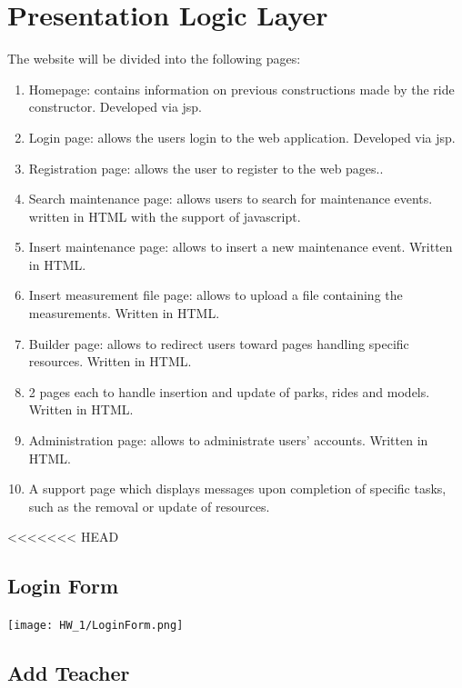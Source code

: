 \section{Presentation Logic Layer}
\graphicspath{ {./HW_1/images/} }

The website will be divided into the following pages:
\begin{enumerate}
    \item Homepage: contains information on previous constructions made by the ride constructor. Developed via
jsp.
    \item Login page: allows the users login to the web application. Developed via jsp.
    \item Registration page: allows the user to register to the web pages..
    \item Search maintenance page: allows users to search for maintenance events. written in HTML with the
support of javascript.
    \item Insert maintenance page: allows to insert a new maintenance event. Written in HTML.
    \item Insert measurement file page: allows to upload a file containing the measurements. Written in HTML.
    \item Builder page: allows to redirect users toward pages handling specific resources. Written in HTML.
    \item 2 pages each to handle insertion and update of parks, rides and models. Written in HTML.
    \item Administration page: allows to administrate users’ accounts. Written in HTML.
    \item A support page which displays messages upon completion of specific tasks, such as the removal or update
of resources.
\end{enumerate}

<<<<<<< HEAD
\subsection{Login Form}


\texttt{[image: HW\_1/LoginForm.png]}

\subsection{Add Teacher}

